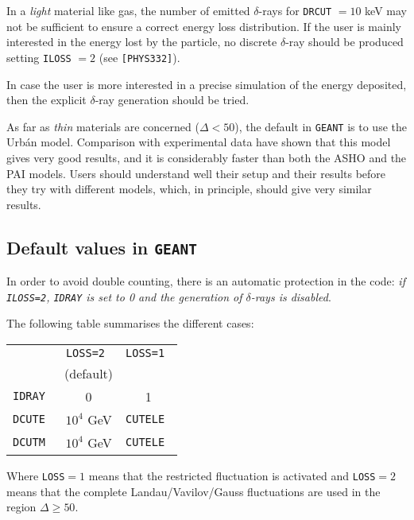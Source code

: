 In a {\it light} material like gas, the number of emitted $\delta$-rays for
{\tt DRCUT} $=10$ keV may not be sufficient to ensure a correct energy loss 
distribution. If the user is mainly interested in the energy lost by the 
particle, no discrete $\delta$-ray should be produced setting {\tt ILOSS} 
$=2$ (see {\tt [PHYS332]}).

In case the user is more interested in a precise simulation of the energy 
deposited, then the explicit $\delta$-ray generation should be tried.

As far as {\it thin} materials are concerned ($\Delta < 50$), the default
in {\tt GEANT} is to use the Urb\'{a}n model. Comparison with experimental
data have shown that this model gives very good results, and it is
considerably faster than both the ASHO and the PAI models. Users should
understand well their setup and their results before they try with
different models, which, in principle, should give very similar results.

\subsection{Default values in {\tt GEANT}}
 
In order to avoid double counting, there is an automatic protection in
the code:
{\it if {\tt ILOSS=2}, {\tt IDRAY} is set to 0 and the generation of 
$\delta$-rays is disabled}.
 
The following table summarises the different cases:
\begin{center}
\begin{tabular}{|c|c|c|}\hline
                    &\tt LOSS=2          &\tt LOSS=1     \\
                    &(default)            &               \\
                    \cline{2-3}
     \tt IDRAY      & 0                   &     1          \\
     \tt DCUTE      &  $10^4$ GeV         & \tt CUTELE     \\
     \tt DCUTM      &  $10^4$ GeV         & \tt CUTELE     \\
\hline
\end{tabular}
\end{center}
Where {\tt LOSS}$=1$ means that the restricted fluctuation is 
activated and {\tt LOSS}$=2$ means that the complete Landau/Vavilov/Gauss
fluctuations are used in the region $\Delta \geq 50$. 
